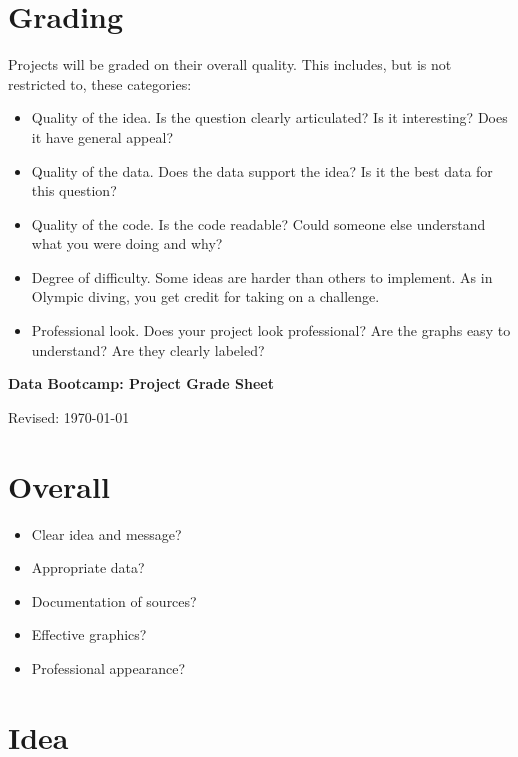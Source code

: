 \documentclass[11pt]{article}
\begin{document}
\section*{Grading}

Projects will be graded on their overall quality.  This includes, but is not restricted to,
these categories:
%
\begin{itemize}
\item Quality of the idea.  Is the question clearly articulated?  Is it interesting?
Does it have general appeal?
\item Quality of the data.  Does the data support the idea?
Is it the best data for this question?
\item Quality of the code. Is the code readable? Could someone else understand what you were doing and why?
\item Degree of difficulty.  Some ideas are harder than others to implement.
As in Olympic diving, you get credit for taking on a challenge.
\item Professional look.  Does your project look professional?  Are the graphs
easy to understand?  Are they clearly labeled?
\end{itemize}





\pagebreak
\thispagestyle{empty}


\bigskip\bigskip
\centerline{\Large \bf Data Bootcamp:  Project Grade Sheet}
\centerline{Revised: \today}


\section*{Overall}

\begin{itemize} %
\item Clear idea and message?
\item Appropriate data?
\item Documentation of sources?
\item Effective graphics?
\item Professional appearance?
\end{itemize}
\bigskip

\section*{Idea}
\end{document}
